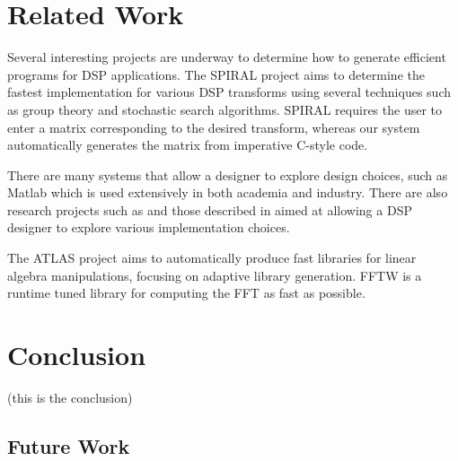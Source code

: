 \section{Related Work}
\label{sec:related}

Several interesting projects are underway to determine how to generate
efficient programs for DSP applications. The SPIRAL
project\cite{spiral,xiong-thesis,xiong01spl,johnson01searching,egner01automatic}
aims to determine the fastest implementation for various DSP
transforms using several techniques such as group theory and
stochastic search algorithms.  SPIRAL requires the user to enter a
matrix corresponding to the desired transform, whereas our system
automatically generates the matrix from imperative C-style code.

There are many systems that allow a designer to explore design
choices, such as Matlab\cite{matlab} which is used extensively in both
academia and industry.  There are also research projects such as
\cite{covell-ade} and those described in \cite{oppenheim-symbolic}
aimed at allowing a DSP designer to explore various implementation
choices.

The ATLAS project \cite{whaley01automated} aims to automatically
produce fast libraries for linear algebra manipulations, focusing on
adaptive library generation.  FFTW \cite{frigo99fast,fftw} is a
runtime tuned library for computing the FFT as fast as possible.


\section{Conclusion}
\label{sec:conclusion}

(this is the conclusion)

\subsection{Future Work}

